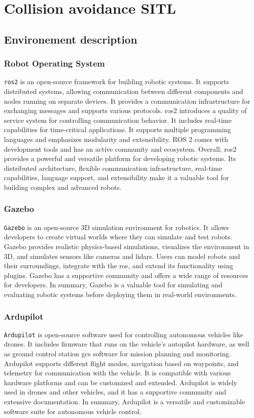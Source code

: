 \section{Collision avoidance SITL}
\subsection{Environement description}
\subsubsection{Robot Operating System}
\texttt{\gls{ros2}} is an open-source framework for building robotic systems. It supports distributed systems, allowing communication between different components and nodes running on separate devices.
It provides a communication infrastructure for exchanging messages and supports various protocols. \gls{ros2} introduces a quality of service system for controlling communication behavior.
It includes real-time capabilities for time-critical applications. It supports multiple programming languages and emphasizes modularity and extensibility. ROS 2 comes with development tools and has an active community and ecosystem.
Overall, \gls{ros2} provides a powerful and versatile platform for developing robotic systems. Its distributed architecture, flexible communication infrastructure, real-time capabilities, language support, and extensibility make it a valuable tool for building complex and advanced robots.
\subsubsection{Gazebo}
\texttt{Gazebo} is an open-source 3D simulation environment for robotics. It allows developers to create virtual worlds where they can simulate and test robots. Gazebo provides realistic physics-based simulations, visualizes the environment in 3D, and simulates sensors like cameras and \gls{lidar}s.
Users can model robots and their surroundings, integrate with the \gls{ros}, and extend its functionality using plugins. Gazebo has a supportive community and offers a wide range of resources for developers.
In summary, Gazebo is a valuable tool for simulating and evaluating robotic systems before deploying them in real-world environments.
\subsubsection{Ardupilot}
\texttt{Ardupilot} is open-source software used for controlling autonomous vehicles like drones. It includes firmware that runs on the vehicle's autopilot hardware, as well as ground control station \gls{gcs} software for mission planning and monitoring.
Ardupilot supports different flight modes, navigation based on waypoints, and telemetry for communication with the vehicle. It is compatible with various hardware platforms and can be customized and extended.
Ardupilot is widely used in drones and other vehicles, and it has a supportive community and extensive documentation. In summary, Ardupilot is a versatile and customizable software suite for autonomous vehicle control.

